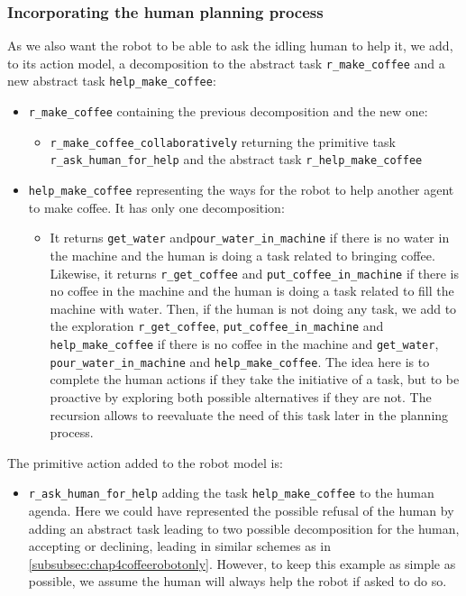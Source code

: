 \documentclass[a4paper,11pt,twoside]{StyleThese}
\begin{document}
\subsubsection{Incorporating the human planning process}
As we also want the robot to be able to ask the idling human to help it, we add, to its action model, a decomposition to the abstract task \verb'r_make_coffee' and a new abstract task \verb'help_make_coffee':

\begin{itemize}
\item \verb'r_make_coffee' containing the previous decomposition and the new one:
	\begin{itemize}
	\item \verb'r_make_coffee_collaboratively' returning the primitive task \verb'r_ask_human_for_help' and the abstract task \verb'r_help_make_coffee'
	\end{itemize}
\item \verb'help_make_coffee' representing the ways for the robot to help another agent to make coffee. It has only one decomposition:
	\begin{itemize}
	\item It returns \verb'get_water' and\verb'pour_water_in_machine' if there is no water in the machine and the human is doing a task related to bringing coffee. Likewise, it returns \verb'r_get_coffee' and \verb'put_coffee_in_machine' if there is no coffee in the machine and the human is doing a task related to fill the machine with water. Then, if the human is not doing any task, we add to the exploration \verb'r_get_coffee', \verb'put_coffee_in_machine' and \verb'help_make_coffee' if there is no coffee in the machine and \verb'get_water', \verb'pour_water_in_machine' and \verb'help_make_coffee'. The idea here is to complete the human actions if they take the initiative of a task, but to be proactive by exploring both possible alternatives if they are not. The recursion allows to reevaluate the need of this task later in the planning process.
	\end{itemize}
\end{itemize}

The primitive action added to the robot model is:
\begin{itemize}
\item \verb'r_ask_human_for_help' adding the task \verb'help_make_coffee' to the human agenda. Here we could have represented the possible refusal of the human by adding an abstract task leading to two possible decomposition for the human, accepting or declining, leading in similar schemes as in \ref{subsubsec:chap4coffeerobotonly}. However, to keep this example as simple as possible, we assume the human will always help the robot if asked to do so.
\end{itemize}
\end{document}
